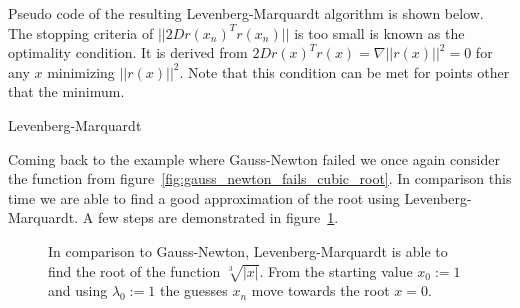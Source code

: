 Pseudo code of the resulting Levenberg-Marquardt algorithm is shown below. The stopping criteria of $||2Dr(x_n)^Tr(x_n)||$ is too small is known as the optimality condition. It is derived from $2Dr(x)^Tr(x) = \nabla||r(x)||^2 = 0$ for any $x$ minimizing $||r(x)||^2$. Note that this condition can be met for points other that the minimum.

\begin{algorithm}[H] \label{alg:levenberg-marquardt}
	\SetAlgoLined
	\DontPrintSemicolon
	\LinesNumbered
	\caption{Levenberg-Marquardt}
	
	\BlankLine
\end{algorithm}
\vspace{1cm}

Coming back to the example where Gauss-Newton failed we once again consider the function from figure~\ref{fig:gauss_newton_fails_cubic_root}. In comparison this time we are able to find a good approximation of the root using Levenberg-Marquardt. A few steps are demonstrated in figure~\ref{fig:levenberg-marquardt-example}.

\begin{figure}[h]
	\centering
	\caption{In comparison to Gauss-Newton, Levenberg-Marquardt is able to find the root of the function $\sqrt[3]{|x|}$. From the starting value $x_0 := 1$ and using $\lambda_0 := 1$ the guesses $x_n$ move towards the root $x=0$.}
	\label{fig:levenberg-marquardt-example}
\end{figure}

